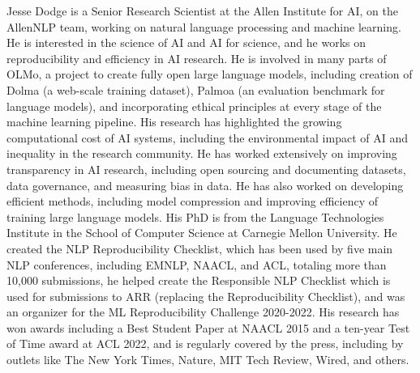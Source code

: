 Jesse Dodge is a Senior Research Scientist at the Allen Institute for AI, on the AllenNLP team, working on natural language processing and machine learning. He is interested in the science of AI and AI for science, and he works on reproducibility and efficiency in AI research. He is involved in many parts of OLMo, a project to create fully open large language models, including creation of Dolma (a web-scale training dataset), Palmoa (an evaluation benchmark for language models), and incorporating ethical principles at every stage of the machine learning pipeline. His research has highlighted the growing computational cost of AI systems, including the environmental impact of AI and inequality in the research community. He has worked extensively on improving transparency in AI research, including open sourcing and documenting datasets, data governance, and measuring bias in data. He has also worked on developing efficient methods, including model compression and improving efficiency of training large language models. His PhD is from the Language Technologies Institute in the School of Computer Science at Carnegie Mellon University. He created the NLP Reproducibility Checklist, which has been used by five main NLP conferences, including EMNLP, NAACL, and ACL, totaling more than 10,000 submissions, he helped create the Responsible NLP Checklist which is used for submissions to ARR (replacing the Reproducibility Checklist), and was an organizer for the ML Reproducibility Challenge 2020-2022. His research has won awards including a Best Student Paper at NAACL 2015 and a ten-year Test of Time award at ACL 2022, and is regularly covered by the press, including by outlets like The New York Times, Nature, MIT Tech Review, Wired, and others.